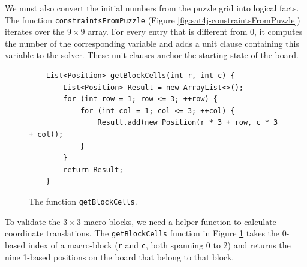\noindent
We must also convert the initial numbers from the puzzle grid into logical facts.
The function \texttt{constraintsFromPuzzle}  (Figure \ref{fig:sat4j-constraintsFromPuzzle}) iterates over
the $9 \times 9$ array. For every entry that is different from $0$, it computes the number of the
corresponding variable and adds a unit clause containing this variable to the solver.  These unit clauses
anchor the starting state of the board. 

\begin{figure}[!ht]
  \centering
\begin{verbatim}
    List<Position> getBlockCells(int r, int c) {
        List<Position> Result = new ArrayList<>();
        for (int row = 1; row <= 3; ++row) {
            for (int col = 1; col <= 3; ++col) {
                Result.add(new Position(r * 3 + row, c * 3 + col));
            }
        }
        return Result;
    }
\end{verbatim}
\vspace*{-0.3cm}
  \caption{The function \texttt{getBlockCells}.}
  \label{fig:sat4j-getBlockCells}
\end{figure}

\noindent
To validate the $3 \times 3$ macro-blocks, we need a helper function to calculate coordinate translations.
The \texttt{getBlockCells} function in Figure \ref{fig:sat4j-getBlockCells} takes the 0-based index of a
macro-block (\texttt{r} and \texttt{c}, both spanning 0 to 2) and returns the nine 1-based positions
on the board that belong to that block. 

